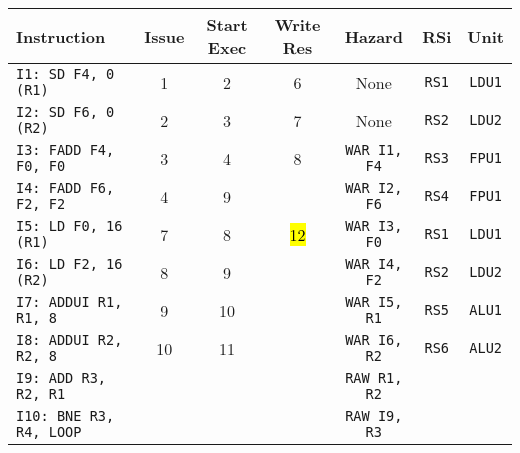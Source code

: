 \begin{enumerate}
    \begin{table}[!htp]
        \centering
        \begin{adjustbox}{width={\textwidth},totalheight={\textheight},keepaspectratio}
        \begin{tabular}{@{} l c c c c c c @{}}
            \toprule
            \textbf{Instruction} & \textbf{Issue} & \textbf{Start Exec} & \textbf{Write Res} & \textbf{Hazard} & \textbf{RSi} & \textbf{Unit} \\
            \midrule
            \texttt{I1: SD F4, 0 (R1)}      & 1 & 2 & 6 & None  & \texttt{RS1}   & \texttt{LDU1}  \\ [.5em]
            \texttt{I2: SD F6, 0 (R2)}      & 2 & 3 & 7 & None  & \texttt{RS2}   & \texttt{LDU2}  \\ [.5em]
            \texttt{I3: FADD F4, F0, F0}    & 3 & 4 & 8 & \texttt{WAR I1, F4}  & \texttt{RS3} & \texttt{FPU1} \\ [.5em]
            \texttt{I4: FADD F6, F2, F2}    & 4 & 9 &   & \texttt{WAR I2, F6} & \texttt{RS4} & \texttt{FPU1} \\ [.5em]
            \texttt{I5: LD F0, 16 (R1)}     & 7 & 8 & \hl{12} & \texttt{WAR I3, F0} & \texttt{RS1} & \texttt{LDU1} \\ [.5em]
            \texttt{I6: LD F2, 16 (R2)}     & 8 & 9 &   & \texttt{WAR I4, F2} & \texttt{RS2} & \texttt{LDU2} \\ [.5em]
            \texttt{I7: ADDUI R1, R1, 8}    & 9 & 10 &   & \texttt{WAR I5, R1} & \texttt{RS5} & \texttt{ALU1} \\ [.5em]
            \texttt{I8: ADDUI R2, R2, 8}    & 10 & 11 &   & \texttt{WAR I6, R2} & \texttt{RS6} & \texttt{ALU2} \\ [.5em]
            \texttt{I9: ADD R3, R2, R1}     &   &   &   & \texttt{RAW R1, R2} &       &       \\ [.5em]
            \texttt{I10: BNE R3, R4, LOOP}   &   &   &   & \texttt{RAW I9, R3} &       &       \\
            \bottomrule
        \end{tabular}
        \end{adjustbox}
    \end{table}
    

\end{enumerate}
